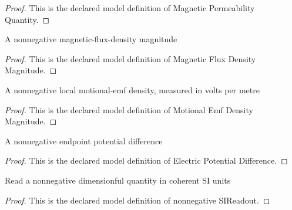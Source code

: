 \begin{proof}
  This is the declared model definition of Magnetic Permeability Quantity.
\end{proof}
\begin{definition}
  \label{def:physics:phyx-mini-0883:phyxminiproblems-problemphyxmini0883-magneticfluxdensitymagnitude}
  A nonnegative magnetic-flux-density magnitude
\end{definition}
\begin{proof}
  This is the declared model definition of Magnetic Flux Density Magnitude.
\end{proof}
\begin{definition}
  \label{def:physics:phyx-mini-0883:phyxminiproblems-problemphyxmini0883-motionalemfdensitymagnitude}
  A nonnegative local motional-emf density, measured in volts per metre
\end{definition}
\begin{proof}
  This is the declared model definition of Motional Emf Density Magnitude.
\end{proof}
\begin{definition}
  \label{def:physics:phyx-mini-0883:phyxminiproblems-problemphyxmini0883-electricpotentialdifference}
  A nonnegative endpoint potential difference
\end{definition}
\begin{proof}
  This is the declared model definition of Electric Potential Difference.
\end{proof}
\begin{definition}
  \label{def:physics:phyx-mini-0883:phyxminiproblems-problemphyxmini0883-nonnegativesireadout}
  Read a nonnegative dimensionful quantity in coherent SI units
\end{definition}
\begin{proof}
  This is the declared model definition of nonnegative SIReadout.
\end{proof}
